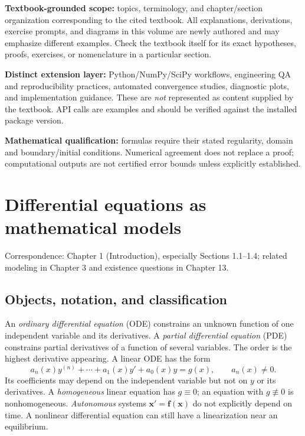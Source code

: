 \documentclass[11pt,letterpaper,oneside]{report}
\theoremstyle{definition}\newtheorem{definition}[theorem]{Definition}
\theoremstyle{remark}\newtheorem{remark}[theorem]{Remark}
\begin{document}
\begin{bookground}
\textbf{Textbook-grounded scope:} topics, terminology, and chapter/section organization corresponding to the cited textbook. All explanations, derivations, exercise prompts, and diagrams in this volume are newly authored and may emphasize different examples. Check the textbook itself for its exact hypotheses, proofs, exercises, or nomenclature in a particular section.
\end{bookground}
\begin{modern}
\textbf{Distinct extension layer:} Python/NumPy/SciPy workflows, engineering QA and reproducibility practices, automated convergence studies, diagnostic plots, and implementation guidance. These are \emph{not} represented as content supplied by the textbook. API calls are examples and should be verified against the installed package version.
\end{modern}
\begin{caution}
\textbf{Mathematical qualification:} formulas require their stated regularity, domain and boundary/initial conditions. Numerical agreement does not replace a proof; computational outputs are not certified error bounds unless explicitly established.
\end{caution}
\tableofcontents\clearpage{}
\chapter{Differential equations as mathematical models}
\begin{bookground}Correspondence: Chapter 1 (Introduction), especially Sections 1.1--1.4; related modeling in Chapter 3 and existence questions in Chapter 13.\end{bookground}
\section{Objects, notation, and classification}
An \emph{ordinary differential equation} (ODE) constrains an unknown function of one independent variable and its derivatives. A \emph{partial differential equation} (PDE) constrains partial derivatives of a function of several variables. The order is the highest derivative appearing. A linear ODE has the form
\begin{equation}\label{eq:linear-n}a_n(x)y^{(n)}+\cdots+a_1(x)y'+a_0(x)y=g(x),\qquad a_n(x)\ne 0.\end{equation}
Its coefficients may depend on the independent variable but not on $y$ or its derivatives. A \emph{homogeneous} linear equation has $g\equiv0$; an equation with $g\not\equiv0$ is nonhomogeneous. \emph{Autonomous} systems $\mathbf x'=\mathbf f(\mathbf x)$ do not explicitly depend on time. A nonlinear differential equation can still have a linearization near an equilibrium.
\end{document}
